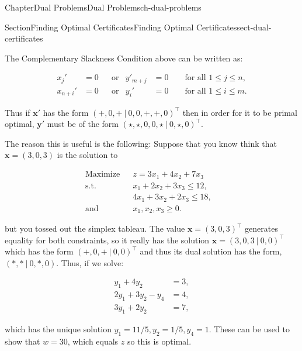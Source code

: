 \documentclass[oneside,10pt,]{book}
\numberwithin{equation}{section}
\newcommand{\amp}{&}
\begin{document}
\begin{chapterptx}{Chapter}{Dual Problems}{}{Dual Problems}{}{}{ch-dual-problems}
\begin{sectionptx}{Section}{Finding Optimal Certificates}{}{Finding Optimal Certificates}{}{}{sect-dual-certificates}
\par
The Complementary Slackness Condition above can be written as:%
\par
%
\begin{equation*}
\begin{aligned} x_{j}' \amp = 0 \amp  \amp \text{or} \amp y'_{m+j} \amp = 0 \qquad \text{for all $1\leq j\leq n$}, \\ x_{n+i}' \amp = 0 \amp  \amp \text{or} \amp y_{i}' \amp = 0 \qquad \text{for all $1 \leq i \leq m$}.
\end{aligned}
\end{equation*}
%
\par
Thus if \(\boldsymbol{x}'\) has the form \((+,0,+~|~0,0,+,+,0)^{\intercal}\) then in order for it to be primal optimal, \(\boldsymbol{y}'\) must be of the form \((\star,\star,0,0,\star~|~0,\star,0)^{\intercal}\).%
\par
The reason this is useful is the following: Suppose that you know think that \(\boldsymbol{x}=(3,0,3)\) is the solution to%
\par
%
\begin{equation*}
\begin{aligned}\text{Maximize} \amp  \amp z = 3x_{1} + 4x_{2} + 7 x_{3} \amp \\ \text{s.t.} \amp  \amp x_{1} + 2x_{2} + 3x_{3} \leq 12, \\ \amp  \amp 4x_{1} + 3x_{2} + 2x_{3} \leq 18, \\ \text{and} \amp  \amp x_{1}, x_{2}, x_{3} \geq 0.\end{aligned}
\end{equation*}
%
\par
but you tossed out the simplex tableau. The value \(\boldsymbol{x}=(3,0,3)^{\intercal}\) generates equality for both constraints, so it really has the solution \(\boldsymbol{x}=(3,0,3~|~0,0)^{\intercal}\) which has the form \((+,0,+~|~0,0)^{\intercal}\) and thus its dual solution has the form, \((*,*~|~0,*,0)\). Thus, if we solve:%
\par
%
\begin{equation*}
\begin{aligned}y_{1} + 4y_{2} \amp = 3, \\ 2y_{1}+3y_{2} -y_{4} \amp = 4, \\ 3y_{1}+2y_{2} \amp = 7,\end{aligned}
\end{equation*}
%
\par
which has the unique solution \(y_{1}=11/5, y_{2}=1/5, y_{4}=1\). These can be used to show that \(w=30\), which equals \(z\) so this is optimal.%

\end{sectionptx}
\end{chapterptx}
\end{document}
